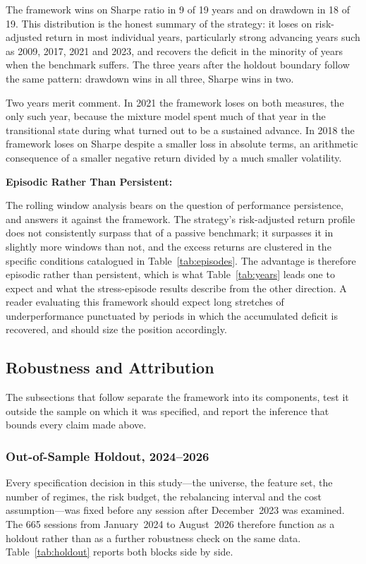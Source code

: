 \documentclass{singlecol-new}
\theoremstyle{TH}{
\newtheorem{lemma}{Lemma}
\newtheorem{theorem}[lemma]{Theorem}
\newtheorem{corrolary}[lemma]{Corrolary}
\newtheorem{conjecture}[lemma]{Conjecture}
\newtheorem{proposition}[lemma]{Proposition}
\newtheorem{claim}[lemma]{Claim}
\newtheorem{stheorem}[lemma]{Wrong Theorem}
\newtheorem{algorithm}{Algorithm}
}
\theoremstyle{THrm}{
\newtheorem{definition}{Definition}[section]
\newtheorem{question}{Question}[section]
\newtheorem{remark}{Remark}
\newtheorem{scheme}{Scheme}
}
\theoremstyle{THhit}{
\newtheorem{case}{Case}[section]
}
\begin{document}
The framework wins on Sharpe ratio in 9 of 19 years and on drawdown in 18 of 19. This
distribution is the honest summary of the strategy: it loses on risk-adjusted return in
most individual years, particularly strong advancing years such as 2009, 2017, 2021 and
2023, and recovers the deficit in the minority of years when the benchmark suffers. The
three years after the holdout boundary follow the same pattern: drawdown wins in all
three, Sharpe wins in two.

Two years merit comment. In 2021 the framework loses on both measures, the only such
year, because the mixture model spent much of that year in the transitional state during
what turned out to be a sustained advance. In 2018 the framework loses on Sharpe despite
a smaller loss in absolute terms, an arithmetic consequence of a smaller negative return
divided by a much smaller volatility.

\textbf{Episodic Rather Than Persistent:}

The rolling window analysis bears on the question of performance persistence, and answers
it against the framework. The strategy's risk-adjusted return profile does not
consistently surpass that of a passive benchmark; it surpasses it in slightly more windows
than not, and the excess returns are clustered in the specific conditions catalogued in
Table~\ref{tab:episodes}. The advantage is therefore episodic rather than persistent,
which is what Table~\ref{tab:years} leads one to expect and what the stress-episode
results describe from the other direction. A reader evaluating this
framework should expect long stretches of underperformance punctuated by periods in which
the accumulated deficit is recovered, and should size the position accordingly.

\subsection{Robustness and Attribution}

The subsections that follow separate the framework into its components, test it outside
the sample on which it was specified, and report the inference that bounds every claim
made above.

\subsubsection{Out-of-Sample Holdout, 2024--2026}
\label{sec:holdout}

Every specification decision in this study---the universe, the feature set, the number of
regimes, the risk budget, the rebalancing interval and the cost assumption---was fixed
before any session after December~2023 was examined. The 665 sessions from January~2024
to August~2026 therefore function as a holdout rather than as a further robustness check
on the same data. Table~\ref{tab:holdout} reports both blocks side by side.
\end{document}
